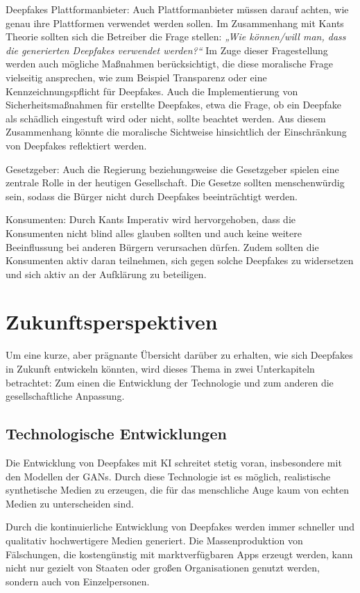 \documentclass[a4paper,12pt]{article}
\begin{document}
Deepfakes Plattformanbieter:
Auch Plattformanbieter müssen darauf achten, wie genau ihre Plattformen verwendet werden sollen. 
Im Zusammenhang mit Kants Theorie sollten sich die Betreiber die Frage stellen: \textit{„Wie können/will man, dass die generierten Deepfakes verwendet werden?“} 
Im Zuge dieser Fragestellung werden auch mögliche Maßnahmen berücksichtigt, die diese moralische Frage vielseitig ansprechen, 
wie zum Beispiel Transparenz oder eine Kennzeichnungspflicht für Deepfakes. Auch die Implementierung von Sicherheitsmaßnahmen für erstellte Deepfakes, etwa die Frage, 
ob ein Deepfake als schädlich eingestuft wird oder nicht, sollte beachtet werden. 
Aus diesem Zusammenhang könnte die moralische Sichtweise hinsichtlich der Einschränkung von Deepfakes reflektiert werden. \cite{Brennan2024} \cite{KantMetaphysik}

Gesetzgeber:
Auch die Regierung beziehungsweise die Gesetzgeber spielen eine zentrale Rolle in der heutigen Gesellschaft. 
Die Gesetze sollten menschenwürdig sein, sodass die Bürger nicht durch Deepfakes beeinträchtigt werden. \cite{ThomsonReuters2024} \cite{KantMetaphysik}

Konsumenten:
Durch Kants Imperativ wird hervorgehoben, dass die Konsumenten nicht blind alles glauben sollten und auch keine weitere Beeinflussung bei anderen Bürgern verursachen dürfen. 
Zudem sollten die Konsumenten aktiv daran teilnehmen, sich gegen solche Deepfakes zu widersetzen und sich aktiv an der Aufklärung zu beteiligen. \cite{UNR2023} \cite{KantMetaphysik}
\newpage

\section{Zukunftsperspektiven}
Um eine kurze, aber prägnante Übersicht darüber zu erhalten, wie sich Deepfakes in Zukunft entwickeln könnten, 
wird dieses Thema in zwei Unterkapiteln betrachtet: Zum einen die Entwicklung der Technologie und zum anderen die gesellschaftliche Anpassung.
\subsection{Technologische Entwicklungen}
Die Entwicklung von Deepfakes mit KI schreitet stetig voran, insbesondere mit den Modellen der GANs. 
Durch diese Technologie ist es möglich, realistische synthetische Medien zu erzeugen, die für das menschliche Auge kaum von echten Medien zu unterscheiden sind.  

Durch die kontinuierliche Entwicklung von Deepfakes werden immer schneller und qualitativ hochwertigere Medien generiert. 
Die Massenproduktion von Fälschungen, die kostengünstig mit marktverfügbaren Apps erzeugt werden, kann nicht nur gezielt von Staaten oder großen Organisationen genutzt werden, 
sondern auch von Einzelpersonen. \cite{SWP2024}
\end{document}
